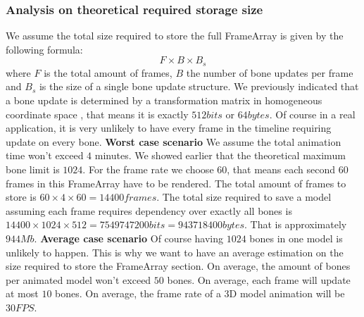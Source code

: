 \subsubsection{Analysis on theoretical required storage size}
We assume the total size required to store the full FrameArray is given by the following formula:
\begin{equation}
    F \times B \times B_s
\end{equation}
where $F$ is the total amount of frames, $B$ the number of bone updates per frame and $B_s$ is the size of a single bone update structure.\newline
We previously indicated that a bone update is determined by a transformation matrix in homogeneous coordinate space \cite{HomogeneousCoordinates}, that means it is exactly $512bits$ or $64bytes$.\newline
Of course in a real application, it is very unlikely to have every frame in the timeline requiring update on every bone.
\vspace{12pt}
\newline\textbf{Worst case scenario}\newline
We assume the total animation time won't exceed $4$ minutes.\newline
We showed earlier that the theoretical maximum bone limit is $1024$.\newline
For the frame rate we choose $60$, that means each second $60$ frames in this FrameArray have to be rendered.\newline
The total amount of frames to store is $60 \times 4 \times 60 = 14400frames$.\newline
The total size required to save a model assuming each frame requires dependency over exactly all bones is $14400 \times 1024 \times 512 = 7549747200bits = 943718400bytes$. That is approximately $944Mb$.
\vspace{12pt}
\newline\textbf{Average case scenario}\newline
Of course having $1024$ bones in one model is unlikely to happen. This is why we want to have an average estimation on the size required to store the FrameArray section.\newline
On average, the amount of bones per animated model won't exceed $50$ bones.\newline
On average, each frame will update at most $10$ bones.\newline
On average, the frame rate of a 3D model animation will be $30FPS$.\newline
